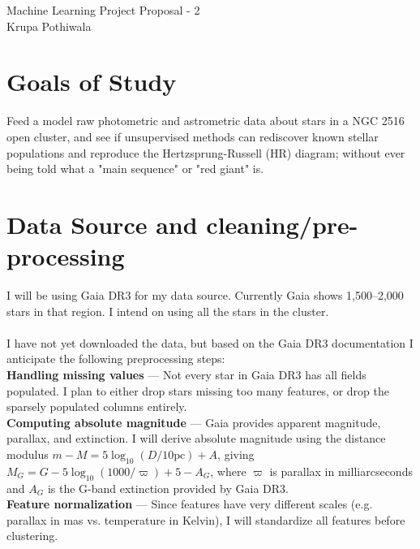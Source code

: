 \documentclass[12pt]{article}
\begin{document}
\begin{center}
    \LARGE{Machine Learning Project Proposal - 2}\\
    \large{Krupa Pothiwala}
\end{center}

\section{Goals of Study}
Feed a model raw photometric and astrometric data about stars in a NGC 2516 open cluster, and see if unsupervised methods can rediscover known stellar populations and reproduce the Hertzsprung-Russell (HR) diagram; without ever being told what a "main sequence" or "red giant" is.

\section{Data Source and cleaning/pre-processing}
I will be using Gaia DR3 for my data source. Currently Gaia shows 1,500–2,000 stars in that region. I intend on using all the stars in the cluster.\\
\\
I have not yet downloaded the data, but based on the Gaia DR3 documentation I anticipate the following preprocessing steps:\\
\textbf{Handling missing values} — Not every star in Gaia DR3 has all fields populated. I plan to either drop stars missing too many features, or drop the sparsely populated columns entirely.\\
\textbf{Computing absolute magnitude} — Gaia provides apparent magnitude, parallax, and extinction. I will derive absolute magnitude using the distance modulus $m - M = 5\log_{10}(D/10\text{pc}) + A$, giving  $M_G = G - 5\log_{10}(1000/\varpi) + 5 - A_G$, where $\varpi$ is parallax in milliarcseconds and $A_G$ is the G-band extinction provided by Gaia DR3.\\
\textbf{Feature normalization} — Since features have very different scales (e.g. parallax in mas vs. temperature in Kelvin), I will standardize all features before clustering.
\end{document}
